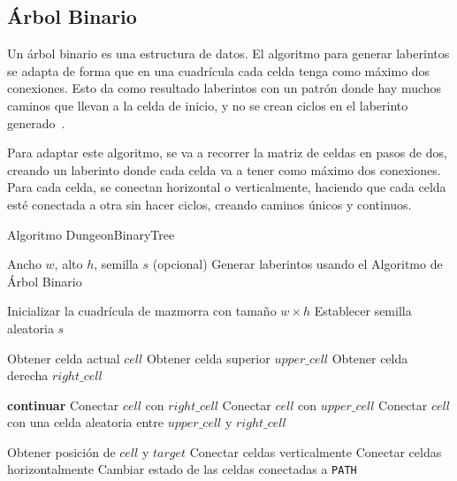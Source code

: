 \subsection{Árbol Binario}
Un árbol binario es una estructura de datos.
El algoritmo para generar laberintos se adapta de forma que en una cuadrícula cada celda tenga como máximo dos conexiones. Esto da como resultado laberintos con un patrón donde hay muchos caminos que llevan a la celda de inicio, y no se crean ciclos en el laberinto generado~\cite{wikipediaMazeGeneration}.

Para adaptar este algoritmo, se va a recorrer la matriz de celdas en pasos de dos, creando un laberinto donde cada celda va a tener como máximo dos conexiones. Para cada celda, se conectan horizontal o verticalmente, haciendo que cada celda esté conectada a otra sin hacer ciclos, creando caminos únicos y continuos.




\begin{algorithm}
\caption{Algoritmo DungeonBinaryTree}
\begin{algorithmic}[1]
\Require Ancho $w$, alto $h$, semilla $s$ (opcional)
\Ensure Generar laberintos usando el Algoritmo de Árbol Binario

\State Inicializar la cuadrícula de mazmorra con tamaño $w \times h$
    \State Establecer semilla aleatoria $s$
\EndIf

        \State Obtener celda actual $cell$
        \State Obtener celda superior $upper\_cell$
        \State Obtener celda derecha $right\_cell$
        
            \State \textbf{continuar}
            \State Conectar $cell$ con $right\_cell$
            \State Conectar $cell$ con $upper\_cell$
        \Else
            \State Conectar $cell$ con una celda aleatoria entre $upper\_cell$ y $right\_cell$
        \EndIf
    \EndFor
\EndFor

    \State Obtener posición de $cell$ y $target$
        \State Conectar celdas verticalmente
    \Else
        \State Conectar celdas horizontalmente
    \EndIf
    \State Cambiar estado de las celdas conectadas a \texttt{PATH}
\EndProcedure

\end{algorithmic}
\end{algorithm}



